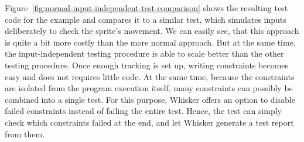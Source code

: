 Figure~\ref{fig:normal-input-independent-test-comparison} shows the resulting test code for the example
and compares it to a similar test, which simulates inputs deliberately to check the sprite's movement.
We can easily see, that this approach is quite a bit more costly than the more normal approach.
But at the same time, the input-independent testing procedure is able to scale better than the other testing procedure.
Once enough tracking is set up, writing constraints becomes easy and does not requires little code.
At the same time, because the constraints are isolated from the program execution itself,
many constraints can possibly be combined into a single test.
For this purpose, Whisker offers an option to disable failed constraints instead of failing the entire test.
Hence, the test can simply check which constraints failed at the end, and let Whisker generate a test report from them.



